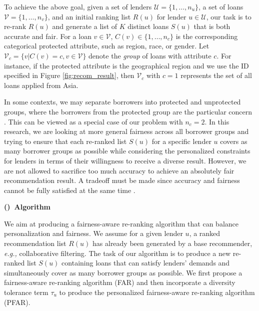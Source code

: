 
To achieve the above goal, given a set of lenders $\mathcal U=\{1,\ldots,n_u\}$, a set of loans $\mathcal V=\{1,\ldots,n_v\}$, and an initial ranking list $R(u)$ for lender $u\in \mathcal U$, our task is to re-rank $R(u)$ and generate a list of $K$ distinct loans $S(u)$ that is both accurate and fair. For a loan $v\in\mathcal V$, $C(v)\in\{1,\ldots,n_c\}$ is the corresponding categorical protected attribute, such as region, race, or gender. Let $\mathcal V_c=\{v|C(v)=c, v\in \mathcal V\}$ denote the \emph{group} of loans with attribute $c$. For instance, if the protected attribute is the geographical region and we use the ID specified in Figure \ref{fig:recom_result}, then $\mathcal V_c$ with $c=1$ represents the set of all loans applied from Asia.


In some contexts, we may separate borrowers into protected and unprotected groups, where the borrowers from the protected group are the particular concern \cite{zliobaite2015survey}. This can be viewed as a special case of our problem with $n_c=2$. In this research, we are looking at more general fairness across all borrower groups and trying to ensure that each re-ranked list $S(u)$ for a specific lender $u$ covers as many borrower groups as possible while considering the personalized constraints for lenders in terms of their willingness to receive a diverse result. However, we are not allowed to sacrifice too much accuracy to achieve an absolutely fair recommendation result. A tradeoff must be made since accuracy and fairness cannot be fully satisfied at the same time \cite{burke_robin_multisided_nodate}.



\vspace{0.25cm}
\noindent \textbf{()~Algorithm}
\vspace{0.25cm}


We aim at producing a fairness-aware re-ranking algorithm that can balance personalization and fairness. We assume for a given lender $u$, a ranked recommendation list $R(u)$ has already been generated by a base recommender, \emph{e.g.,} collaborative filtering. The task of our algorithm is to produce a new re-ranked list $S(u)$ containing loans that can satisfy lenders' demands and simultaneously cover as many borrower groups as possible. We first propose a fairness-aware re-ranking algorithm (FAR) and then incorporate a diversity tolerance term $\tau_u$ to produce the personalized fairness-aware re-ranking algorithm (PFAR).


